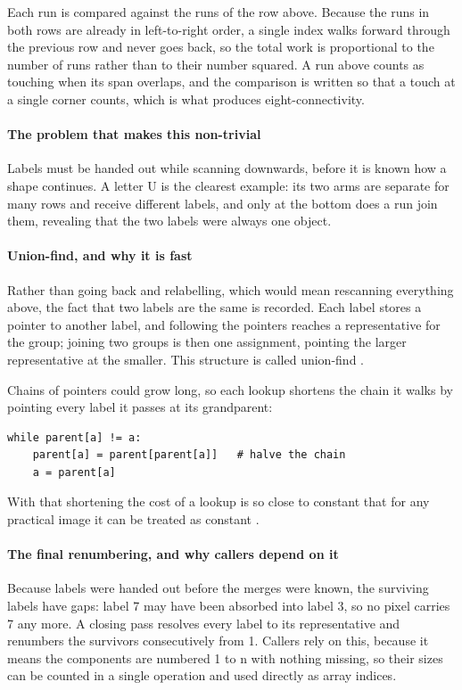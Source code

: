 Each run is compared against the runs of the row above. Because the runs in both rows are already in left-to-right order, a single index walks forward through the previous row and never goes back, so the total work is proportional to the number of runs rather than to their number squared. A run above counts as touching when its span overlaps, and the comparison is written so that a touch at a single corner counts, which is what produces eight-connectivity.


\paragraph{The problem that makes this non-trivial}
Labels must be handed out while scanning downwards, before it is known how a shape continues. A letter U is the clearest example: its two arms are separate for many rows and receive different labels, and only at the bottom does a run join them, revealing that the two labels were always one object.


\paragraph{Union-find, and why it is fast}
Rather than going back and relabelling, which would mean rescanning everything above, the fact that two labels are the same is recorded. Each label stores a pointer to another label, and following the pointers reaches a representative for the group; joining two groups is then one assignment, pointing the larger representative at the smaller. This structure is called union-find \cite{tarjan1975}.

Chains of pointers could grow long, so each lookup shortens the chain it walks by pointing every label it passes at its grandparent:


\begin{lstlisting}[style=plain]
while parent[a] != a:
    parent[a] = parent[parent[a]]   # halve the chain
    a = parent[a]
\end{lstlisting}
With that shortening the cost of a lookup is so close to constant that for any practical image it can be treated as constant \cite{tarjan1975}.


\paragraph{The final renumbering, and why callers depend on it}
Because labels were handed out before the merges were known, the surviving labels have gaps: label 7 may have been absorbed into label 3, so no pixel carries 7 any more. A closing pass resolves every label to its representative and renumbers the survivors consecutively from 1. Callers rely on this, because it means the components are numbered 1 to n with nothing missing, so their sizes can be counted in a single operation and used directly as array indices.


